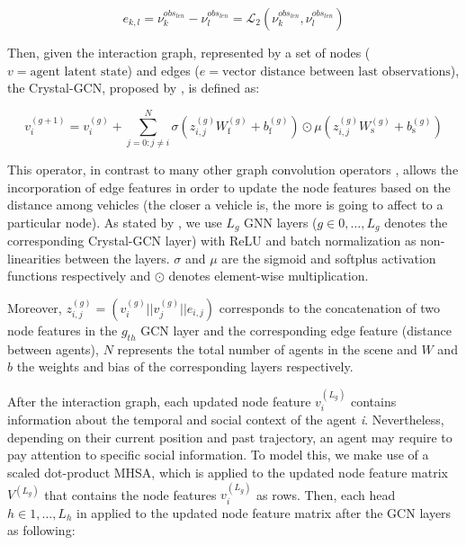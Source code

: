 \begin{equation}
	\label{eq:6_edge_gnn}
	e_{k,l} = \nu^{obs_{len}}_k - \nu^{obs_{len}}_l = \mathcal{L}_2(\nu^{obs_{len}}_k, \nu^{obs_{len}}_l)
\end{equation}

Then, given the interaction graph, represented by a set of nodes ($v = \text{agent latent state}$) and edges ($e= \text{vector distance between last observations}$), the Crystal-\ac{GCN}, proposed by \cite{xie2018crystal}, is defined as:

\begin{equation}
	v_i^{(g+1)} = v_i^{(g)} +
	\sum_{j = 0 : j \neq i }^{N} \sigma \left(z_{i,j}^{(g)} W_\mathrm{f}^{(g)} + b_\mathrm{f}^{(g)} \right)
	\odot \mu \left(z_{i,j}^{(g)} W_\mathrm{s}^{(g)} + b_\mathrm{s}^{(g)}  \right)
\end{equation}

This operator, in contrast to many other graph convolution operators \cite{zeng2021lanercnn, liang2020learning}, allows the incorporation of edge features in order to update the node features based on the distance among vehicles (the closer a vehicle is, the more is going to affect to a particular node). As stated by \cite{schmidt2022crat}, we use $L_g$ \ac{GNN} layers ($g \in 0, \dots , L_g$ denotes the corresponding Crystal-\ac{GCN} layer) with \ac{ReLU} and batch normalization as non-linearities between the layers. $\sigma$ and $\mu$ are the sigmoid and softplus activation functions respectively and $\odot$ denotes element-wise multiplication.

Moreover, $z_{i,j}^{(g)} = (v_i^{(g)} || v_j^{(g)} || e_{i,j} )$ corresponds to the concatenation of two node features in the \textit{$g_{th}$} \ac{GCN} layer and the corresponding edge feature (distance between agents), $N$ represents the total number of agents in the scene and $W$ and $b$ the weights and bias of the corresponding layers respectively.

After the interaction graph, each updated node feature $v_i^{(L_g)}$ contains information about the temporal and social context of the agent \textit{i}. Nevertheless, depending on their current position and past trajectory, an agent may require to pay attention to specific social information. To model this, we make use of a scaled dot-product \ac{MHSA}, which is applied to the updated node feature matrix $V^{(L_g)}$ that contains the node features $v_i^{(L_g)}$ as rows. Then, each head $h \in 1,\dots, L_h$ in applied to the updated node feature matrix after the \ac{GCN} layers as following:

